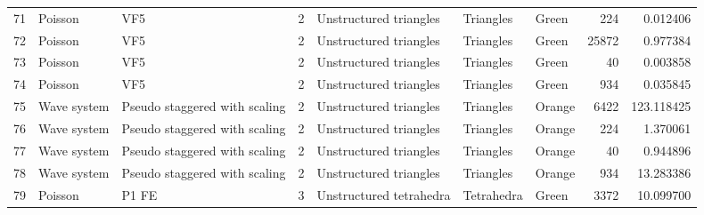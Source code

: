 \begin{tabular}{lllrlllrr}
71  &           Poisson &                            VF5 &               2 &                    Unstructured triangles &              Triangles  &                                Green &                      224 &                         0.012406 \\
72  &           Poisson &                            VF5 &               2 &                    Unstructured triangles &              Triangles  &                                Green &                    25872 &                         0.977384 \\
73  &           Poisson &                            VF5 &               2 &                    Unstructured triangles &              Triangles  &                                Green &                       40 &                         0.003858 \\
74  &           Poisson &                            VF5 &               2 &                    Unstructured triangles &              Triangles  &                                Green &                      934 &                         0.035845 \\
75  &       Wave system &  Pseudo staggered with scaling &               2 &                    Unstructured triangles &              Triangles  &                               Orange &                     6422 &                       123.118425 \\
76  &       Wave system &  Pseudo staggered with scaling &               2 &                    Unstructured triangles &              Triangles  &                               Orange &                      224 &                         1.370061 \\
77  &       Wave system &  Pseudo staggered with scaling &               2 &                    Unstructured triangles &              Triangles  &                               Orange &                       40 &                         0.944896 \\
78  &       Wave system &  Pseudo staggered with scaling &               2 &                    Unstructured triangles &              Triangles  &                               Orange &                      934 &                        13.283386 \\
79  &           Poisson &                          P1 FE &               3 &                   Unstructured tetrahedra &             Tetrahedra  &                                Green &                     3372 &                        10.099700 \\

\end{tabular}
